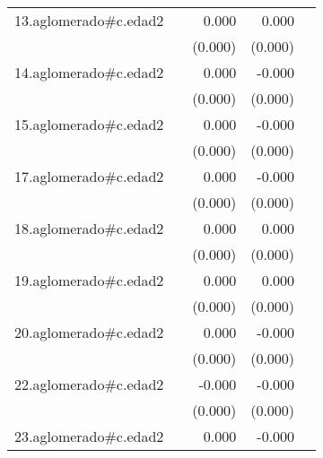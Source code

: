 {\begin{longtable}{l*{4}{D{.}{.}{-1}}}
\addlinespace
13.aglomerado#c.edad2&                     &       0.000\sym{**} &       0.000         &                     \\
            &                     &     (0.000)         &     (0.000)         &                     \\
\addlinespace
14.aglomerado#c.edad2&                     &       0.000         &      -0.000         &                     \\
            &                     &     (0.000)         &     (0.000)         &                     \\
\addlinespace
15.aglomerado#c.edad2&                     &       0.000         &      -0.000\sym{*}  &                     \\
            &                     &     (0.000)         &     (0.000)         &                     \\
\addlinespace
17.aglomerado#c.edad2&                     &       0.000         &      -0.000         &                     \\
            &                     &     (0.000)         &     (0.000)         &                     \\
\addlinespace
18.aglomerado#c.edad2&                     &       0.000         &       0.000         &                     \\
            &                     &     (0.000)         &     (0.000)         &                     \\
\addlinespace
19.aglomerado#c.edad2&                     &       0.000         &       0.000         &                     \\
            &                     &     (0.000)         &     (0.000)         &                     \\
\addlinespace
20.aglomerado#c.edad2&                     &       0.000         &      -0.000         &                     \\
            &                     &     (0.000)         &     (0.000)         &                     \\
\addlinespace
22.aglomerado#c.edad2&                     &      -0.000         &      -0.000\sym{**} &                     \\
            &                     &     (0.000)         &     (0.000)         &                     \\
\addlinespace
23.aglomerado#c.edad2&                     &       0.000         &      -0.000         &                     \\

\end{longtable}}
